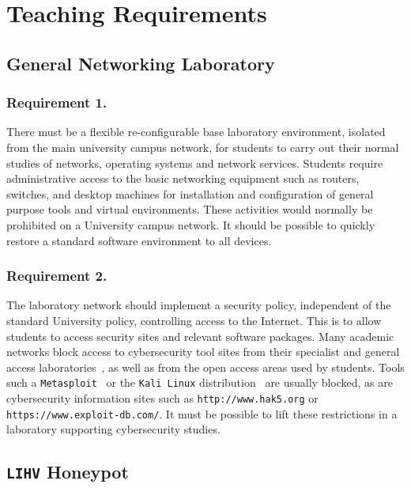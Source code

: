 \documentclass{llncs}
\begin{document}
\section{Teaching Requirements}\label{sec:TeachingRequire}

\subsection{General Networking Laboratory}\label{subsec:GeneralLab}

\subsubsection{Requirement 1.} 
There must be a flexible re-configurable base laboratory environment, isolated
from the main university campus network, for students to carry out their normal
studies of networks, operating systems and network services. Students require
administrative access to the basic networking equipment such as routers,
switches, and desktop machines for installation and configuration of general
purpose tools and virtual environments. These activities would normally be
prohibited on a University campus network. It should be possible to quickly
restore a standard software environment to all devices.

\subsubsection{Requirement 2.}
The laboratory network should implement a security policy, independent of the
standard University policy, controlling access to the Internet. This is to
allow students to access security sites and relevant software packages. Many
academic networks block access to cybersecurity tool sites from their
specialist and general access laboratories~\cite{ACGO:06,YYLCHJ:04}, as well as
from the open access areas used by students. Tools such a
\texttt{Metasploit}~\cite{R7:17} or the \texttt{Kali Linux}
distribution~\cite{OS:17} are usually blocked, as are cybersecurity information
sites such as \texttt{http://www.hak5.org} or
\texttt{https://www.exploit-db.com/}. It must be possible to lift these
restrictions in a laboratory supporting cybersecurity studies.

\subsection{\texttt{LIHV} Honeypot}\label{subsec:LabHoneypot}
\end{document}
